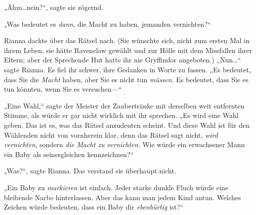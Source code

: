 „Ähm…nein?“, sagte sie zögernd.

„Was bedeutet es \emph{dann}, die Macht zu haben, jemanden vernichten?“

Rianna dachte über das Rätsel nach. (Sie wünschte sich, nicht zum ersten Mal in ihrem Leben, sie hätte Ravenclaw gewählt und zur Hölle mit dem Missfallen ihrer Eltern; aber der Sprechende Hut hatte ihr nie Gryffindor angeboten.) „Nun…“ sagte Rianna. Es fiel ihr schwer, ihre Gedanken in Worte zu fassen. „Es bedeutet, dass Sie die \emph{Macht} haben, aber Sie es nicht tun \emph{müssen}. Es bedeutet, dass Sie es tun könnten, wenn Sie es versuchen—“

„Eine Wahl,“ sagte der Meister der Zaubertränke mit derselben weit entfernten Stimme, als würde er gar nicht wirklich mit ihr sprechen. „Es wird eine Wahl geben. Das ist es, was das Rätsel anzudeuten scheint. Und diese Wahl ist für den Wählenden nicht von vornherein klar, denn das Rätsel sagt nicht, \emph{wird} \emph{vernichten}, sondern \emph{die Macht zu} \emph{vernichten}. Wie würde ein erwachsener Mann ein Baby als seinesgleichen kennzeichnen?“

„Was?“, sagte Rianna. Das verstand sie überhaupt nicht.

„Ein Baby zu \emph{markieren} ist einfach. Jeder starke dunkle Fluch würde eine bleibende Narbe hinterlassen. Aber das kann man jedem Kind antun. Welches Zeichen würde bedeuten, dass ein Baby dir \emph{ebenbürtig} ist?“

